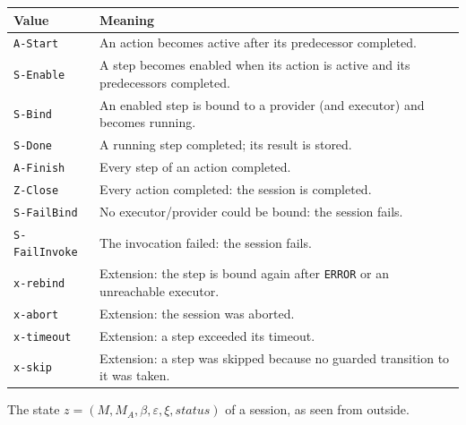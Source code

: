 \documentclass[a4paper]{arrowhead}
\begin{document}
{\small
\begin{longtable}{|p{3.9cm}|p{11.9cm}|}

\hline
\rowcolor{gray!33} Value & Meaning \\ \hline
\endhead
\texttt{A-Start} & An action becomes active after its predecessor completed. \\ \hline
\texttt{S-Enable} & A step becomes enabled when its action is active and its predecessors completed. \\ \hline
\texttt{S-Bind} & An enabled step is bound to a provider (and executor) and becomes running. \\ \hline
\texttt{S-Done} & A running step completed; its result is stored. \\ \hline
\texttt{A-Finish} & Every step of an action completed. \\ \hline
\texttt{Z-Close} & Every action completed: the session is completed. \\ \hline
\texttt{S-FailBind} & No executor/provider could be bound: the session fails. \\ \hline
\texttt{S-FailInvoke} & The invocation failed: the session fails. \\ \hline
\texttt{x-rebind} & Extension: the step is bound again after \texttt{ERROR} or an unreachable executor. \\ \hline
\texttt{x-abort} & Extension: the session was aborted. \\ \hline
\texttt{x-timeout} & Extension: a step exceeded its timeout. \\ \hline
\texttt{x-skip} & Extension: a step was skipped because no guarded transition to it was taken. \\ \hline
\end{longtable}
}

The state $z = (M, M_A, \beta, \varepsilon, \xi, status)$ of a session, as seen from outside.
\end{document}

